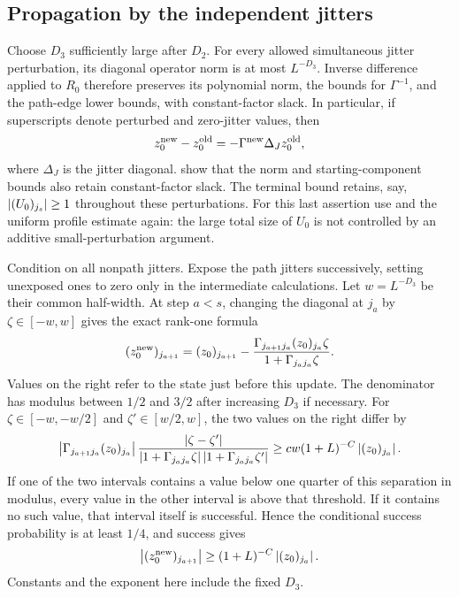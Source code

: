 \subsection{Propagation by the independent jitters}

Choose $D_3$ sufficiently large after $D_2$. For every allowed
simultaneous jitter perturbation, its diagonal operator norm is at
most $L^{-D_3}$. Inverse difference applied to $R_0$ therefore
preserves its polynomial norm, the bounds for $\Gamma^{-1}$, and
the path-edge lower bounds, with constant-factor slack. In particular,
if superscripts denote perturbed and zero-jitter values, then
\[
 z_0^{\rm new}-z_0^{\rm old}
 =-\Gamma^{\rm new}\Delta_J z_0^{\rm old},
\]
where $\Delta_J$ is the jitter diagonal.
 show that the norm
and starting-component bounds also retain constant-factor slack.
The terminal bound retains, say, $\left\lvert(U_0)_{j_s}\right\rvert\ge1$ throughout
these perturbations. For this last assertion use
 and the uniform profile estimate again:
the large total size of $U_0$ is not controlled by an additive
small-perturbation argument.

Condition on all nonpath jitters. Expose the path jitters successively,
setting unexposed ones to zero only in the intermediate calculations.
Let $w=L^{-D_3}$ be their common half-width. At step $a<s$, changing
the diagonal at $j_a$ by $\zeta\in[-w,w]$ gives the exact rank-one
formula
\begin{equation}
 (z_0^{\rm new})_{j_{a+1}}
 =(z_0)_{j_{a+1}}
 -\frac{\Gamma_{j_{a+1}j_a}(z_0)_{j_a}\zeta}
             {1+\Gamma_{j_a j_a}\zeta}.
 \label{trans:jitter-update}
\end{equation}
Values on the right refer to the state just before this update.
The denominator has modulus between $1/2$ and $3/2$ after increasing
$D_3$ if necessary. For $\zeta\in[-w,-w/2]$ and
$\zeta'\in[w/2,w]$, the two values on the right differ by
\[
 \left\lvert\Gamma_{j_{a+1}j_a}(z_0)_{j_a}\right\rvert
 \frac{\left\lvert\zeta-\zeta'\right\rvert}
 {\left\lvert1+\Gamma_{j_a j_a}\zeta\right\rvert
  \left\lvert1+\Gamma_{j_a j_a}\zeta'\right\rvert}
 \ge c w(1+L)^{-C}\left\lvert(z_0)_{j_a}\right\rvert.
\]
If one of the two intervals contains a value below one quarter of
this separation in modulus, every value in the other interval is
above that threshold. If it contains no such value, that interval
itself is successful. Hence the conditional success probability is
at least $1/4$, and success gives
\begin{equation}
 \left\lvert(z_0^{\rm new})_{j_{a+1}}\right\rvert
 \ge(1+L)^{-C}\left\lvert(z_0)_{j_a}\right\rvert.
 \label{trans:jitter-gain}
\end{equation}
Constants and the exponent here include the fixed $D_3$.


